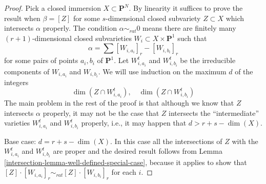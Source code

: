 \begin{proof}

Pick a closed immersion $X \subset \mathbf{P}^N$.
By linearity it suffices to prove the result when $\beta = [Z]$ for some
$s$-dimensional closed subvariety $Z \subset X$ which intersects $\alpha$
properly. The condition $\alpha \sim_{rat} 0$ means there
are finitely many $(r + 1)$-dimensional closed subvarieties
$W_i \subset X \times \mathbf{P}^1$ such that
$$
\alpha = \sum [W_{i, a_i}]_r - [W_{i, b_i}]_r
$$
for some pairs of points $a_i, b_i$ of $\mathbf{P}^1$.
Let $W_{i, a_i}^t$ and $W_{i, b_i}^t$ be the irreducible components
of $W_{i, a_i}$ and $W_{i, b_i}$.
We will use induction on the maximum $d$ of the integers
$$
\dim(Z \cap W_{i, a_i}^t),\quad \dim(Z \cap W_{i, b_i}^t)
$$
The main problem in the rest of the proof is that although we know that $Z$
intersects $\alpha$ properly, it may not be the case that $Z$ intersects the
``intermediate'' varieties $W_{i, a_i}^t$
and $W_{i, b_i}^t$ properly, i.e., it may happen that $d >  r + s - \dim(X)$.

\medskip\noindent
Base case: $d = r + s - \dim(X)$. In this case all the intersections of
$Z$ with the $W_{i, a_i}^t$ and $W_{i, b_i}^t$ are proper and the
desired result follows from Lemma \ref{intersection-lemma-well-defined-special-case},
because it applies to show that
$[Z] \cdot [W_{i, a_i}]_r \sim_{rat} [Z] \cdot [W_{i, b_i}]_r$ for
each $i$.


\end{proof}
